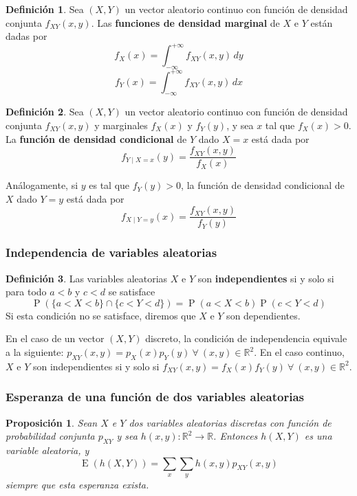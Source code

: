 \documentclass[11pt]{article}
\theoremstyle{plain}
\newtheorem*{pro}{Proposición}
\theoremstyle{definition}
\newtheorem*{defi}{Definición}
\theoremstyle{remark}
\newcommand{\deft}[1]{\textbf{#1}}  %
\newcommand{\proba}{\ensuremath{\operatorname{P}}}  %
\newcommand{\esp}[0]{\ensuremath{\operatorname{E}}}  %
\newcommand{\foralle}{\ensuremath{\forall \ }}  %
\begin{document}
    \begin{defi}
      Sea $(X,Y)$ un vector aleatorio continuo con función de densidad conjunta $f_{XY}(x,y)$. Las \deft{funciones de densidad marginal} de $X$ e $Y$ están dadas por
      \[ f_X(x) = \int_{-\infty}^{+\infty} f_{XY}(x,y) \,dy \]
      \[ f_Y(x) = \int_{-\infty}^{+\infty} f_{XY}(x,y) \,dx \]
    \end{defi}

    \begin{defi}
      Sea $(X,Y)$ un vector aleatorio continuo con función de densidad conjunta $f_{XY}(x,y)$ y marginales $f_X(x)$ y $f_Y(y)$, y sea $x$ tal que $f_X(x) > 0$. La \deft{función de densidad condicional} de $Y$ dado $X = x$ está dada por
      \[ f_{Y \mid X = x}(y) = \frac{f_{XY}(x,y)}{f_X(x)} \]

      Análogamente, si $y$ es tal que $f_Y(y) > 0$, la función de densidad condicional de $X$ dado $Y = y$ está dada por
      \[ f_{X \mid Y = y}(x) = \frac{f_{XY}(x,y)}{f_Y(y)} \]
    \end{defi}

    \subsubsection{Independencia de variables aleatorias}

      \begin{defi}
        Las variables aleatorias $X$ e $Y$ son \deft{independientes} si y solo si para todo $a < b$ y $c < d$ se satisface
        \[ \proba(\lbrace a < X < b \rbrace \cap \lbrace c < Y < d \rbrace) = \proba(a < X < b) \proba(c < Y < d) \]
        Si esta condición no se satisface, diremos que $X$ e $Y$ son dependientes.
      \end{defi}

      En el caso de un vector $(X,Y)$ discreto, la condición de independencia equivale a la siguiente: $p_{XY}(x,y) = p_X(x) p_Y(y) \ \foralle (x,y) \in \mathbb{R}^2$. En el caso continuo, $X$ e $Y$ son independientes si y solo si $f_{XY}(x,y) = f_X(x) f_Y(y) \ \foralle (x,y) \in \mathbb{R}^2$.

    \subsubsection{Esperanza de una función de dos variables aleatorias}

      \begin{pro}
        Sean $X$ e $Y$ dos variables aleatorias discretas con función de probabilidad conjunta $p_{XY}$ y sea $h(x,y) : \mathbb{R}^2 \to \mathbb{R}$. Entonces $h(X,Y)$ es una variable aleatoria, y
        \[ \esp(h(X,Y)) = \sum_x \sum_y h(x,y) p_{XY}(x,y) \]
        siempre que esta esperanza exista.
      \end{pro}
\end{document}
